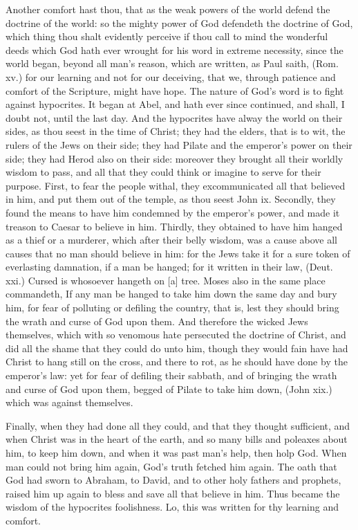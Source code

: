 Another comfort hast thou, that as the weak 
powers of the world defend the doctrine of the 
world: so the mighty power of God defendeth 
the doctrine of God, which thing thou shalt 
evidently perceive if thou call to mind the wonderful
deeds which God hath ever wrought for 
his word in extreme necessity, since the world 
began, beyond all man's reason, which are written, 
as Paul saith, (Rom. xv.) for our learning and not 
for our deceiving, that we, through patience 
and comfort of the Scripture, might have 
hope. The nature of God's word is to fight 
against hypocrites. It began at Abel, and hath 
ever since continued, and shall, I doubt not, until
the last day. And the hypocrites have alway 
the world on their sides, as thou seest in the 
time of Christ; they had the elders, that is to
wit, the rulers of the Jews on their side; they 
had Pilate and the emperor's power on their side; 
they had Herod also on their side: moreover 
they brought all their worldly wisdom to pass, and 
all that they could think or imagine to serve for 
their purpose. First, to fear the people withal,
they excommunicated all that believed in him,
and put them out of the temple, as thou seest 
John ix. Secondly, they found the means to 
have him condemned by the emperor's power, and 
made it treason to Caesar to believe in him. 
Thirdly, they obtained to have him hanged as a 
thief or a murderer, which after their belly wisdom,
was a cause above all causes that no man 
should believe in him: for the Jews take it for a 
sure token of everlasting damnation, if a man be 
hanged; for it written in their law, (Deut. xxi.) 
Cursed is whosoever hangeth on [a] tree. Moses
also in the same place commandeth, If any 
man be hanged to take him down the same day 
and bury him, for fear of polluting or defiling 
the country, that is, lest they should bring the 
wrath and curse of God upon them. And therefore
the wicked Jews themselves, which with so 
venomous hate persecuted the doctrine of Christ, 
and did all the shame that they could do unto 
him, though they would fain have had Christ to 
hang still on the cross, and there to rot, as he 
should have done by the emperor's law: yet for 
fear of defiling their sabbath, and of bringing 
the wrath and curse of God upon them, begged 
of Pilate to take him down, (John xix.) which 
was against themselves. 

Finally, when they had done all they could, and 
that they thought sufficient, and when Christ was 
in the heart of the earth, and so many bills and 
poleaxes about him, to keep him down, and when 
it was past man's help, then holp God. When 
man could not bring him again, God's truth 
fetched him again. The oath that God had 
sworn to Abraham, to David, and to other holy 
fathers and prophets, raised him up again to bless 
and save all that believe in him. Thus became 
the wisdom of the hypocrites foolishness. Lo, this 
was written for thy learning and comfort.

